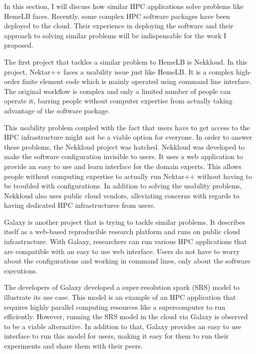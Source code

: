 In this section, I will discuss how similar HPC applications solve problems like HemeLB faces. Recently, some complex HPC software packages have been deployed to the cloud. Their experience in deploying the software and their approach to solving similar problems will be indispensable for the work I proposed.

The first project that tackles a similar problem to HemeLB is Nekkloud. In this project, Nektar++ faces a usability issue just like HemeLB. It is a complex high-order finite element code which is mainly operated using command line interface. The original workflow is complex and only a limited number of people can operate it, barring people without computer expertise from actually taking advantage of the software package.

This usability problem coupled with the fact that users have to get access to the HPC infrastructure might not be a viable option for everyone. In order to answer these problems, the Nekkloud project was hatched. Nekkloud was developed to make the software configuration invisible to users. It uses a web application to provide an easy to use and learn interface for the domain experts. This allows people without computing expertise to actually run Nektar++ without having to be troubled with configurations. In addition to solving the usability problems, Nekkloud also uses public cloud vendors, alleviating concerns with regards to having dedicated HPC infrastructures from users. 

Galaxy \citep{goecks2010galaxy} is another project that is trying to tackle similar problems. It describes itself as a web-based reproducible research platform and runs on public cloud infrastructure. With Galaxy, researchers can run various HPC applications that are compatible with an easy to use web interface. Users do not have to worry about the configurations and working in command lines, only about the software executions.

The developers of Galaxy developed a super-resolution spark (SRS) model to illustrate its use case. This model is an example of an HPC application that requires highly parallel computing resources like a supercomputer to run efficiently. However, running the SRS model in the cloud via Galaxy is observed to be a viable alternative. In addition to that, Galaxy provides an easy to use interface to run this model for users, making it easy for them to run their experiments and share them with their peers.

